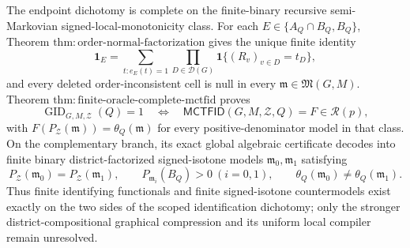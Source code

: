 The endpoint dichotomy is complete on the finite-binary recursive semi-Markovian signed-local-monotonicity class. For each \(E\in\{A_Q\cap B_Q,B_Q\}\), Theorem \(\mathrm{thm:order\text{-}normal\text{-}factorization}\) gives the unique finite identity
\[
 \mathbf 1_E=\sum_{t:e_E(t)=1}\prod_{D\in\mathcal D(G)}\mathbf 1\{(R_v)_{v\in D}=t_D\},
\]
and every deleted order-inconsistent cell is null in every \(\mathfrak m\in\mathfrak M(G,M)\). Theorem \(\mathrm{thm:finite\text{-}oracle\text{-}complete\text{-}mctfid}\) proves
\[
 \operatorname{GID}_{G,M,\mathcal Z}(Q)=1
 \quad\Longleftrightarrow\quad
 \mathsf{MCTFID}(G,M,\mathcal Z,Q)=F\in\mathcal R(p),
\]
with \(F(P_{\mathcal Z}(\mathfrak m))=\theta_Q(\mathfrak m)\) for every positive-denominator model in that class. On the complementary branch, its exact global algebraic certificate decodes into finite binary district-factorized signed-isotone models \(\mathfrak m_0,\mathfrak m_1\) satisfying
\[
 P_{\mathcal Z}(\mathfrak m_0)=P_{\mathcal Z}(\mathfrak m_1),\qquad
 P_{\mathfrak m_i}(B_Q)>0\ (i=0,1),\qquad
 \theta_Q(\mathfrak m_0)\ne\theta_Q(\mathfrak m_1).
\]
Thus finite identifying functionals and finite signed-isotone countermodels exist exactly on the two sides of the scoped identification dichotomy; only the stronger district-compositional graphical compression and its uniform local compiler remain unresolved.
